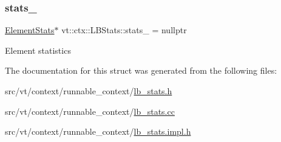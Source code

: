 \subsubsection{\texorpdfstring{stats\+\_\+}{stats\_}}
{\footnotesize\ttfamily \hyperlink{structvt_1_1ctx_1_1_l_b_stats_aaf24fff3db7252f70df0a02e12966eb4}{Element\+Stats}$\ast$ vt\+::ctx\+::\+L\+B\+Stats\+::stats\+\_\+ = nullptr\hspace{0.3cm}{\ttfamily [private]}}

Element statistics 

The documentation for this struct was generated from the following files\+:\begin{DoxyCompactItemize}
\item 
src/vt/context/runnable\+\_\+context/\hyperlink{lb__stats_8h}{lb\+\_\+stats.\+h}\item 
src/vt/context/runnable\+\_\+context/\hyperlink{lb__stats_8cc}{lb\+\_\+stats.\+cc}\item 
src/vt/context/runnable\+\_\+context/\hyperlink{lb__stats_8impl_8h}{lb\+\_\+stats.\+impl.\+h}\end{DoxyCompactItemize}
